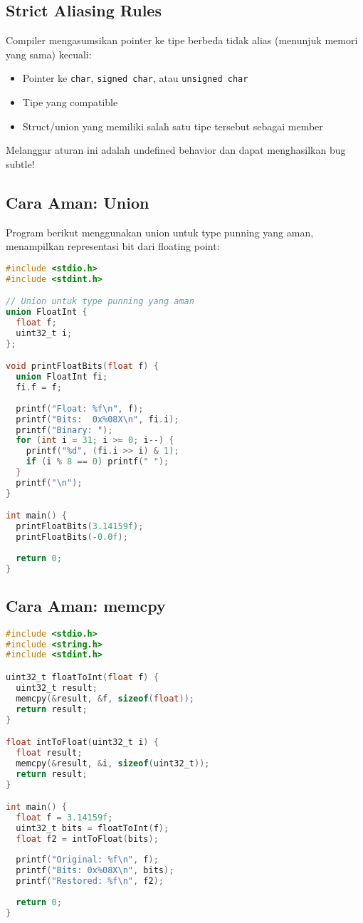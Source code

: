 \documentclass[../main.tex]{subfiles}
\begin{document}
\subsection{Strict Aliasing Rules}
Compiler mengasumsikan pointer ke tipe berbeda tidak alias (menunjuk memori yang sama) kecuali:
\begin{itemize}
  \item Pointer ke \texttt{char}, \texttt{signed char}, atau \texttt{unsigned char}
  \item Tipe yang compatible
  \item Struct/union yang memiliki salah satu tipe tersebut sebagai member
\end{itemize}

Melanggar aturan ini adalah undefined behavior dan dapat menghasilkan bug subtle!

\subsection{Cara Aman: Union}

Program berikut menggunakan union untuk type punning yang aman, menampilkan representasi bit dari floating point:

\begin{lstlisting}[language=C, caption={Type punning dengan union}]
#include <stdio.h>
#include <stdint.h>

// Union untuk type punning yang aman
union FloatInt {
  float f;
  uint32_t i;
};

void printFloatBits(float f) {
  union FloatInt fi;
  fi.f = f;
  
  printf("Float: %f\n", f);
  printf("Bits:  0x%08X\n", fi.i);
  printf("Binary: ");
  for (int i = 31; i >= 0; i--) {
    printf("%d", (fi.i >> i) & 1);
    if (i % 8 == 0) printf(" ");
  }
  printf("\n");
}

int main() {
  printFloatBits(3.14159f);
  printFloatBits(-0.0f);
  
  return 0;
}
\end{lstlisting}

\subsection{Cara Aman: memcpy}
\begin{lstlisting}[language=C, caption={Type punning dengan memcpy}]
#include <stdio.h>
#include <string.h>
#include <stdint.h>

uint32_t floatToInt(float f) {
  uint32_t result;
  memcpy(&result, &f, sizeof(float));
  return result;
}

float intToFloat(uint32_t i) {
  float result;
  memcpy(&result, &i, sizeof(uint32_t));
  return result;
}

int main() {
  float f = 3.14159f;
  uint32_t bits = floatToInt(f);
  float f2 = intToFloat(bits);
  
  printf("Original: %f\n", f);
  printf("Bits: 0x%08X\n", bits);
  printf("Restored: %f\n", f2);
  
  return 0;
}
\end{lstlisting}
\end{document}
